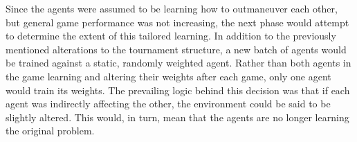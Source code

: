 
Since the agents were assumed to be learning how to outmaneuver each other,
but general game performance was not increasing,
the next phase would attempt to determine the extent of this tailored learning.
%
In addition to the previously mentioned alterations to the tournament structure,
a new batch of agents would be trained against a static, randomly weighted agent.
%
Rather than both agents in the game learning and altering their weights after
each game,
only one agent would train its weights.
%
The prevailing logic behind this decision was that if each agent was indirectly
affecting the other,
the environment could be said to be slightly altered.
%
This would, in turn, mean that the agents are no longer learning the original
problem.

